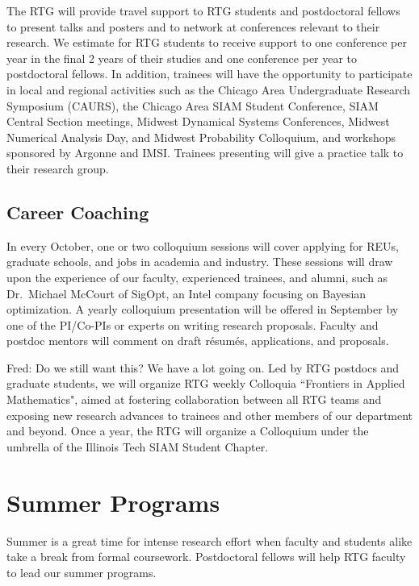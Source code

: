 \documentclass[11pt]{NSFamsart}
\newcommand{\FredNote}[1]{{\color{blue} Fred: #1}}
\begin{document}
The RTG will provide travel support to RTG students and postdoctoral fellows to  present talks and posters and to network at conferences relevant to their research. We estimate for RTG students to receive support to one conference per year in the final 2 years of their studies and one conference per year to postdoctoral fellows.  In addition, trainees will have the opportunity to participate in local and regional activities such as the Chicago Area Undergraduate Research Symposium (CAURS), the Chicago Area SIAM Student Conference, SIAM Central Section meetings, Midwest Dynamical Systems Conferences, Midwest Numerical Analysis Day, and Midwest Probability Colloquium, and workshops sponsored by Argonne and IMSI. Trainees presenting will give a practice talk to their research group.

\subsection*{Career Coaching}
In every October, one or two colloquium sessions will cover applying for REUs, graduate schools, and jobs in academia and industry. These sessions will draw upon the experience of our faculty, experienced trainees, and alumni, such as Dr.\ Michael McCourt of SigOpt, an Intel company focusing on Bayesian optimization.  A yearly colloquium presentation  will be offered in September by one of the PI/Co-PIs or experts on writing research proposals. Faculty and postdoc mentors will comment on draft r\'esum\'es,  applications, and proposals.  


\FredNote{Do we still want this?  We have a lot going on.} Led by RTG postdocs and graduate students, we will organize RTG  weekly   Colloquia ``Frontiers in Applied Mathematics",  aimed at fostering collaboration between all RTG teams and exposing new research advances to trainees and other members of our department and beyond.   
Once a year, the RTG  will organize a Colloquium  under the umbrella of the Illinois Tech SIAM Student Chapter.  


\section{Summer Programs} \label{sec:summer}

Summer is a great time for intense research effort when faculty and students alike take a break from formal coursework.  Postdoctoral fellows will help RTG faculty to lead our  summer programs.
\end{document}
